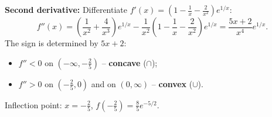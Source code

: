 \begin{solution}
\textbf{Second derivative:} Differentiate $f'(x)=\left(1-\frac1x-\frac2{x^2}\right)e^{1/x}$:
\[ f''(x)=\left(\frac1{x^2}+\frac4{x^3}\right)e^{1/x}-\frac1{x^2}\left(1-\frac1x-\frac2{x^2}\right)e^{1/x}=\frac{5x+2}{x^4}e^{1/x}. \]
The sign is determined by $5x+2$:
\begin{itemize}
  \item $f''<0$ on $(-\infty,-\frac25)$ -- \textbf{concave} ($\cap$);
  \item $f''>0$ on $(-\frac25,0)$ and on $(0,\infty)$ -- \textbf{convex} ($\cup$).
\end{itemize}
Inflection point: $x=-\frac25$, $f(-\frac25)=\frac85e^{-5/2}$.
\end{solution}
